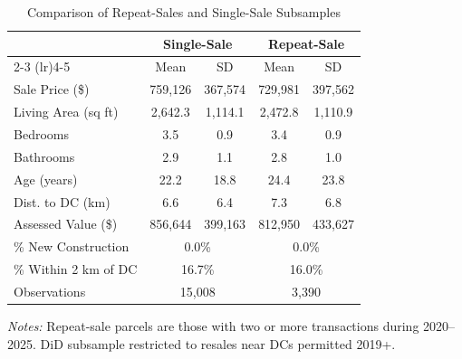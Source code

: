 \begin{table}[htbp]
\centering
\caption{Comparison of Repeat-Sales and Single-Sale Subsamples}
\label{tab:balance}
\small
\begin{tabular}{lcccc}
\toprule
 & \multicolumn{2}{c}{Single-Sale} & \multicolumn{2}{c}{Repeat-Sale} \\
\cmidrule(lr){2-3} \cmidrule(lr){4-5}
 & Mean & SD & Mean & SD \\
\midrule
Sale Price (\$) & 759,126 & 367,574 & 729,981 & 397,562 \\
Living Area (sq ft) & 2,642.3 & 1,114.1 & 2,472.8 & 1,110.9 \\
Bedrooms & 3.5 & 0.9 & 3.4 & 0.9 \\
Bathrooms & 2.9 & 1.1 & 2.8 & 1.0 \\
Age (years) & 22.2 & 18.8 & 24.4 & 23.8 \\
Dist. to DC (km) & 6.6 & 6.4 & 7.3 & 6.8 \\
Assessed Value (\$) & 856,644 & 399,163 & 812,950 & 433,627 \\
\% New Construction & \multicolumn{2}{c}{0.0\%} & \multicolumn{2}{c}{0.0\%} \\
\% Within 2 km of DC & \multicolumn{2}{c}{16.7\%} & \multicolumn{2}{c}{16.0\%} \\
\midrule
Observations & \multicolumn{2}{c}{15,008} & \multicolumn{2}{c}{3,390} \\
\bottomrule
\end{tabular}
\begin{tablenotes}\small
\item \textit{Notes:} Repeat-sale parcels are those with two or more transactions
during 2020--2025. DiD subsample restricted to resales near DCs permitted 2019+.
\end{tablenotes}
\end{table}
